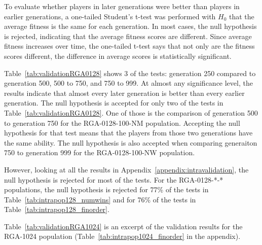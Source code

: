 To evaluate whether players in later generations were better than players in
earlier generations, a one-tailed Student's t-test was performed with $H_{0}$
that the average fitness is the same for each generation. In most cases, the
null hypothesis is rejected, indicating that the average fitness scores are
different. Since average fitness increases over time, the one-tailed t-test says
that not only are the fitness scores different, the difference in average scores
is statistically significant.

Table~\ref{tab:validationRGA0128} shows 3 of the tests: generation 250 compared
to generation 500, 500 to 750, and 750 to 999. At almost any significance level,
the results indicate that almost every later generation is better than every
earlier generation. The null hypothesis is accepted for only two of the tests in
Table~\ref{tab:validationRGA0128}. One of those is the comparison of generation
500 to generation 750 for the RGA-0128-100-NM population. Accepting the null
hypothesis for that test means that the players from those two generations have
the same ability. The null hypothesis is also accepted when comparing
generaiton 750 to generation 999 for the RGA-0128-100-NW population.

However, looking at all the results in Appendix~\ref{appendix:intravalidation}, 
the null hypothesis is rejected for most of the tests. For the RGA-0128-*-*
populations, the null hypothesis is rejected for 77\% of the tests in
Table~\ref{tab:intrapop128_numwins} and for 76\% of the tests in
Table~\ref{tab:intrapop128_finorder}.

Table~\ref{tab:validationRGA1024} is an excerpt of the validation results
for the RGA-1024 population (Table~\ref{tab:intrapop1024_finorder} in the
appendix).

